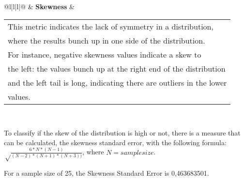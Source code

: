 \begin{table}[]
\begin{tabular}{@{}l|l|l|@{}}
                          & \textbf{Skewness}                                                      & \begin{tabular}[c]{@{}l@{}}This metric indicates the lack of symmetry in a distribution, \\ where the results bunch up in one side of the distribution. \\ For instance, negative skewness values indicate a skew to \\ the left: the values bunch up  at the right end of the distribution \\ and the left tail is long, indicating there are outliers in the lower \\ values.\end{tabular}                                                                                                                                                                                                                                       \\ \bottomrule
\end{tabular}
\end{table}


To classify if the skew of the distribution is high or not, there is a measure that can be calculated, the skewness standard error, with the following formula: 
$\sqrt\frac{6*N*(N-1)}{(N-2)*(N+1)*(N+3))}$, where $N = sample size$.

For a sample size of 25, the Skewness Standard Error is 0,463683501.
